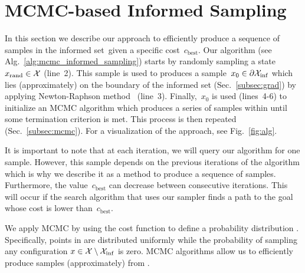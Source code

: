 \documentclass[letterpaper, 10 pt, conference]{ieeeconf}  %
\begin{document}
\section{MCMC-based Informed Sampling}

In this section we describe our approach to efficiently produce a sequence of samples in the informed set~\Cinf given a specific cost~$c_{\text{best}}$.
Our algorithm (see Alg.~\ref{alg:mcmc_informed_sampling}) starts by randomly sampling a state~$x_\text{rand} \in \mathcal{X}$ (line~2).
This sample is used to produces a 
sample~$x_0 \in \partial\mathcal{X}_{\rm {inf}}$ 
which lies (approximately) on the boundary of the informed set (Sec.~\ref{subsec:grad}) by applying Newton-Raphson method~\cite{RT06} (line~3).
Finally,~$x_0$ 
is used (lines~4-6)
to initialize an MCMC algorithm which produces a series of samples within \Cinf until some termination criterion is met.
This process is then repeated (Sec.~\ref{subsec:mcmc}). 
For a visualization of the approach, see Fig.~\ref{fig:alg}.

It is important to note that at each iteration, we will query our algorithm for one sample. However, this sample depends on the previous iterations of the algorithm which is why we describe it as a method to produce a sequence of samples.
Furthermore, the value~$c_{\text{best}}$ can decrease between consecutive iterations.
This will occur if the search algorithm that uses our sampler finds a path to the goal whose cost is lower than~$c_{\text{best}}$.

We apply MCMC by using the cost function to define a probability distribution \Pinf.
Specifically, points in \Cinf are distributed uniformly
while 
the probability of sampling any configuration $x \in \mathcal{X} \setminus \mathcal{X}_{\rm {inf}}$ is zero.
MCMC algorithms allow us to  efficiently produce samples (approximately) from \Pinf.
\end{document}

